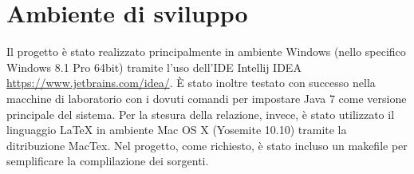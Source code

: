 %
%
%

\section{Ambiente di sviluppo}
Il progetto \`{e} stato realizzato principalmente in ambiente Windows (nello specifico Windows 8.1 Pro 64bit) tramite l'uso dell'IDE Intellij IDEA \url{https://www.jetbrains.com/idea/}. \`{E} stato inoltre testato con successo nella macchine di laboratorio con i dovuti comandi per impostare Java 7 come versione principale del sistema.
Per la stesura della relazione, invece, \`{e} stato utilizzato il linguaggio \LaTeX{} in ambiente Mac OS X (Yosemite 10.10) tramite la ditribuzione MacTex.
Nel progetto, come richiesto, \`{e} stato incluso un makefile per semplificare la complilazione dei sorgenti. 
